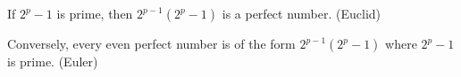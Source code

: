 If $2^p - 1$ is prime, then $2^{p-1}(2^p - 1)$ is a perfect number. (Euclid)

Conversely, every even perfect number is of the form $2^{p-1}(2^p - 1)$ where $2^p - 1$ is prime. (Euler)
